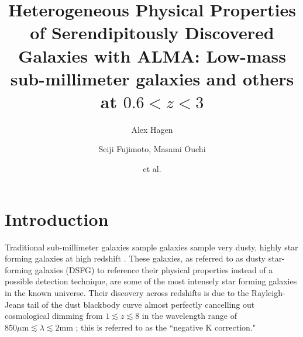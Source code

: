 \documentclass[preprint,natbib209]{aastex}
\begin{document}
\title{Heterogeneous Physical Properties of Serendipitously Discovered Galaxies with ALMA: 
Low-mass sub-millimeter galaxies and others at $0.6 < z < 3$}

\author{Alex Hagen}

\author{Seiji Fujimoto, Masami Ouchi}

\author{et al.}


\begin{abstract} 

\end{abstract}


\section{Introduction}
\label{sec:intro}

Traditional sub-millimeter galaxies sample galaxies sample very dusty, highly star forming galaxies at high redshift \citep[e.g.][and references therein]{blain02, lagache05, casey14, lutz14}. These galaxies, as referred to as dusty star-forming galaxies (DSFG) to reference their physical properties instead of a possible detection technique, are some of the most intensely star forming galaxies in the known universe. Their discovery across redshifts is due to the Rayleigh-Jeans tail of the dust blackbody curve almost perfectly cancelling out cosmological dimming from $1 \lesssim z \lesssim 8$ in the wavelength range of $850\text{$\mu$m} \lesssim \lambda \lesssim 2\text{mm}$ \citep[See][Figure 3]{casey14}; this is referred to as the ``negative K correction."
\end{document}
